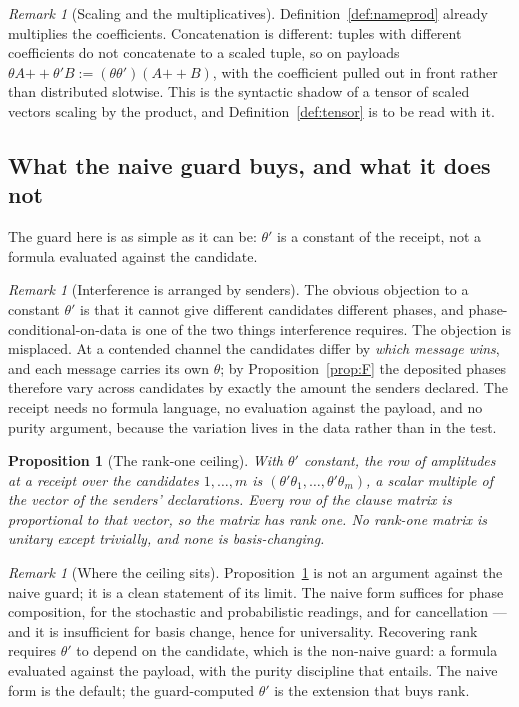 \documentclass[11pt]{article}
\newtheorem{proposition}[theorem]{Proposition}
\theoremstyle{definition}
\theoremstyle{remark}
\newtheorem{remark}[theorem]{Remark}
\begin{document}
\begin{remark}[Scaling and the multiplicatives]
\label{rem:scalingtensor}
Definition~\ref{def:nameprod} already multiplies the coefficients.
Concatenation is different: tuples with different
coefficients do not concatenate to a scaled tuple, so on payloads
$\theta A \mathbin{+\!\!+} \theta' B := (\theta\theta')(A \mathbin{+\!\!+} B)$,
with the coefficient pulled out in front rather than distributed slotwise. This
is the syntactic shadow of a tensor of scaled vectors scaling by the product,
and Definition~\ref{def:tensor} is to be read with it.
\end{remark}

\subsection{What the naive guard buys, and what it does not}

The guard here is as simple as it can be: $\theta'$ is a constant of the
receipt, not a formula evaluated against the candidate.

\begin{remark}[Interference is arranged by senders]
\label{rem:sendersarrange}
The obvious objection to a constant $\theta'$ is that it cannot give different
candidates different phases, and phase-conditional-on-data is one of the two
things interference requires. The objection is misplaced. At a contended channel
the candidates differ by \emph{which message wins}, and each message carries its
own $\theta$; by Proposition~\ref{prop:F} the deposited phases therefore vary
across candidates by exactly the amount the senders declared. The receipt needs
no formula language, no evaluation against the payload, and no purity argument,
because the variation lives in the data rather than in the test.
\end{remark}

\begin{proposition}[The rank-one ceiling]
\label{prop:rankone}
With $\theta'$ constant, the row of amplitudes at a receipt over the candidates
$1,\ldots,m$ is $(\theta'\theta_1, \ldots, \theta'\theta_m)$, a scalar multiple
of the vector of the senders' declarations. Every row of the clause matrix is
proportional to that vector, so the matrix has rank one. No rank-one matrix is
unitary except trivially, and none is basis-changing.
\end{proposition}

\begin{remark}[Where the ceiling sits]
Proposition~\ref{prop:rankone} is not an argument against the naive guard; it is
a clean statement of its limit. The naive form suffices for phase composition,
for the stochastic and probabilistic readings, and for cancellation --- and it
is insufficient for basis change, hence for universality. Recovering rank
requires $\theta'$ to depend on the candidate, which is the non-naive guard: a
formula evaluated against the payload, with the purity discipline that entails.
The naive form is the default; the guard-computed $\theta'$ is the extension
that buys rank.
\end{remark}
\end{document}
